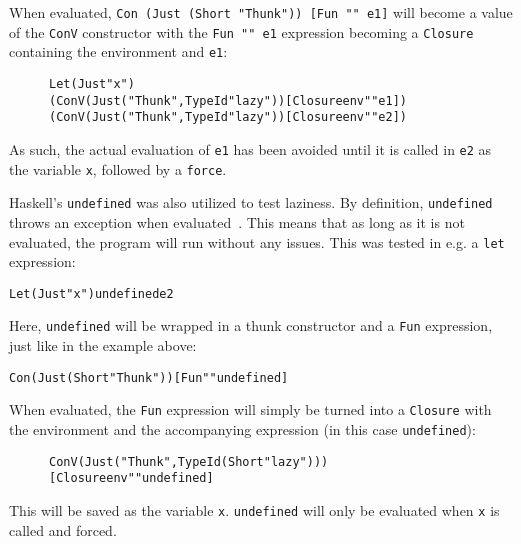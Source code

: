 \noindent When evaluated, \texttt{Con (Just (Short "Thunk")) [Fun "" e1]} will
become a value of the \texttt{ConV} constructor with the \texttt{Fun "" e1}
expression becoming a \texttt{Closure} containing the environment and
\texttt{e1}:
\begin{figure}[!ht]
\begin{alltt}
  Let (Just "x")
    (ConV (Just ("Thunk",TypeId "lazy")) [Closure env "" e1])
    (ConV (Just ("Thunk",TypeId "lazy")) [Closure env "" e2])
\end{alltt}
\end{figure}

\noindent As such, the actual evaluation of \texttt{e1} has been avoided
until it is called in \texttt{e2} as the variable \texttt{x}, followed by a
\texttt{force}.

Haskell's \texttt{undefined} was also utilized to test laziness. By definition,
\texttt{undefined} throws an exception when evaluated~\cite{Undefine63:online}.
This means that as long as it is not evaluated, the program will run without
any issues. This was tested in e.g. a \texttt{let} expression:
\begin{alltt}
  Let (Just "x") undefined e2
\end{alltt}
Here, \texttt{undefined} will be wrapped in a thunk constructor and a
\texttt{Fun} expression, just like in the example above:
\begin{alltt}
  Con (Just (Short "Thunk")) [Fun "" undefined]
\end{alltt}
When evaluated, the
\texttt{Fun} expression will simply be turned into a \texttt{Closure} with the
environment and the accompanying expression (in this case \texttt{undefined}):
\begin{figure}[!ht]
\begin{alltt}
  ConV (Just ("Thunk",TypeId (Short "lazy")))
    [Closure env "" undefined]
\end{alltt}
\end{figure}

\noindent This will be saved as the variable \texttt{x}. \texttt{undefined} will
only be evaluated when \texttt{x} is called and forced.
